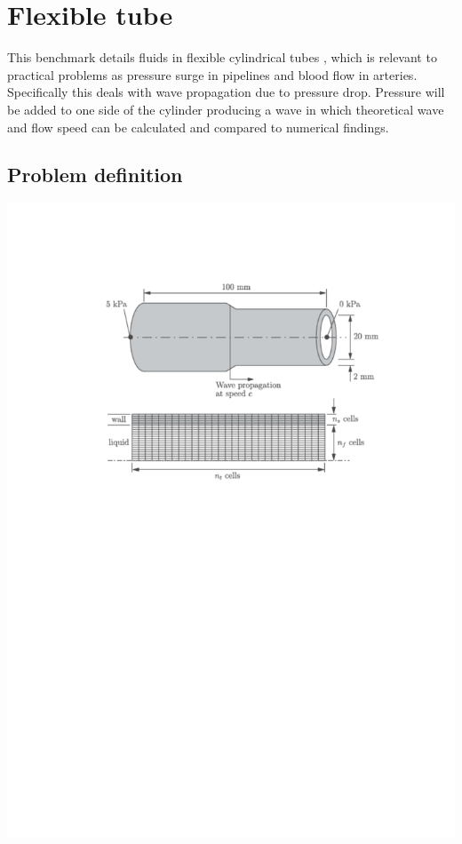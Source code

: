 \newpage
\newpage
\section{Flexible tube}
This benchmark details fluids in flexible cylindrical tubes \cite{Greenshields2005}, which is relevant to practical problems as pressure surge in pipelines and blood flow in arteries. Specifically this deals with wave propagation due to pressure drop. Pressure will be added to one side of the cylinder producing a wave in which theoretical wave and flow speed can be calculated and compared to numerical findings.

\subsection*{Problem definition}
\begin{center} 
\includegraphics[scale=0.6,trim={0 15cm 0 10},clip]{./Verification_Validation/Flexible_tube/Pictures/definition.pdf}
\end{center}

